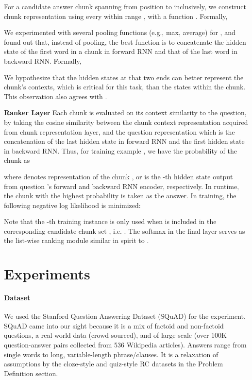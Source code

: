 \documentclass[letterpaper]{article}
\begin{document}
For a candidate answer chunk  spanning from position  to  inclusively, we construct chunk representation  using every  within range , with a function . Formally,

We experimented with several pooling functions (e.g., max, average) for , and found out that, instead of pooling, the best function is to concatenate the hidden state of the first word in a chunk in forward RNN and that of the last word in backward RNN. Formally,

We hypothesize that the hidden states at that two ends can better represent the chunk's contexts, which is critical for this task, than the states within the chunk. This observation also agrees with \cite{kobayashi2016dynamic}.






\noindent\textbf{Ranker Layer}
Each chunk  is evaluated on its context similarity to the question, by taking the cosine similarity between the chunk context representation  acquired from chunk representation layer, and the question representation which is the concatenation of the last hidden state in forward RNN and the first hidden state in backward RNN. Thus, for training example , we have the probability of the chunk  as

where  denotes representation of the chunk ,  or  is the -th hidden state output from question 's forward and backward RNN encoder, respectively. In runtime, the chunk with the highest probability is taken as the answer. In training, the following negative log likelihood is minimized:

Note that the -th training instance is only used when  is included in the corresponding candidate chunk set , i.e. .
The softmax in the final layer serves as the list-wise ranking module similar in spirit to \cite{cao2007learning}.


\section{Experiments}

\paragraph{Dataset}
We used the Stanford Question Answering Dataset (SQuAD) \cite{rajpurkar2016squad} for the experiment. SQuAD came into our sight because it is a mix of factoid and non-factoid questions, a real-world data (crowd-sourced), and of large scale (over 100K question-answer pairs collected from 536 Wikipedia articles). Answers range from single words to long, variable-length phrase/clauses. It is a relaxation of assumptions by the cloze-style and quiz-style RC datasets in the Problem Definition section.
\end{document}
